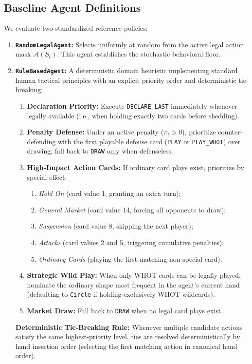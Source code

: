 \documentclass[11pt]{article}
\begin{document}
\subsection{Baseline Agent Definitions}
We evaluate two standardized reference policies:
\begin{enumerate}
  \item \textbf{\texttt{RandomLegalAgent}:} Selects uniformly at random from the active legal action mask $\mathcal{A}(S_t)$. This agent establishes the stochastic behavioral floor.
  \item \textbf{\texttt{RuleBasedAgent}:} A deterministic domain heuristic implementing standard human tactical principles with an explicit priority order and deterministic tie-breaking:
    \begin{enumerate}
      \item \textbf{Declaration Priority:} Execute \texttt{DECLARE\_LAST} immediately whenever legally available (i.e., when holding exactly two cards before shedding).
      \item \textbf{Penalty Defense:} Under an active penalty ($\pi_t > 0$), prioritize counter-defending with the first playable defense card (\texttt{PLAY} or \texttt{PLAY\_WHOT}) over drawing; fall back to \texttt{DRAW} only when defenseless.
      \item \textbf{High-Impact Action Cards:} If ordinary card plays exist, prioritize by special effect:
        \begin{enumerate}
          \item \textit{Hold On} (card value 1, granting an extra turn);
          \item \textit{General Market} (card value 14, forcing all opponents to draw);
          \item \textit{Suspension} (card value 8, skipping the next player);
          \item \textit{Attacks} (card values 2 and 5, triggering cumulative penalties);
          \item \textit{Ordinary Cards} (playing the first matching non-special card).
        \end{enumerate}
      \item \textbf{Strategic Wild Play:} When only WHOT cards can be legally played, nominate the ordinary shape most frequent in the agent's current hand (defaulting to \texttt{Circle} if holding exclusively WHOT wildcards).
      \item \textbf{Market Draw:} Fall back to \texttt{DRAW} when no legal card plays exist.
    \end{enumerate}
    \textbf{Deterministic Tie-Breaking Rule:} Whenever multiple candidate actions satisfy the same highest-priority level, ties are resolved deterministically by hand insertion order (selecting the first matching action in canonical hand order).
\end{enumerate}
\end{document}
